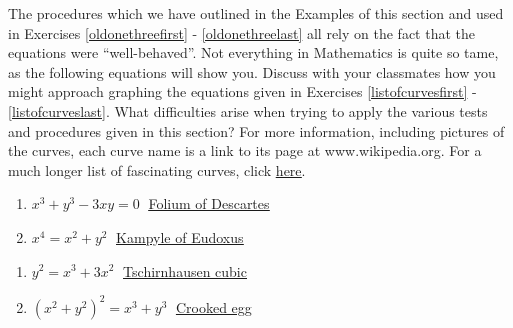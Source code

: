 \documentclass{ximera}
\begin{document}
The procedures which we have outlined in the Examples of this section and used in Exercises \ref{oldonethreefirst} -  \ref{oldonethreelast} all rely on the fact that the equations were ``well-behaved''.  Not everything in Mathematics is quite so tame, as the following equations will show you.  Discuss with your classmates how you might approach graphing the equations given in Exercises \ref{listofcurvesfirst} - \ref{listofcurveslast}.  What difficulties arise when trying to apply the various tests and procedures given in this section?  For more information, including pictures of the curves, each curve name is a link to its page at www.wikipedia.org.  For a much longer list of fascinating curves, click \href{http://en.wikipedia.org/wiki/List_of_curves}{\underline{here}}.


\begin{multicols}{2}
\begin{enumerate}
\setcounter{enumi}{\value{HW}}

\item \label{listofcurvesfirst} $x^{3} + y^{3} - 3xy = 0\;$ \href{http://en.wikipedia.org/wiki/Folium_of_descartes}{\underline{Folium of Descartes}}
\item $x^{4} = x^{2} + y^{2}\;$ \href{http://en.wikipedia.org/wiki/Kampyle_of_Eudoxus}{\underline{Kampyle of Eudoxus}}
\setcounter{HW}{\value{enumi}}
\end{enumerate}
\end{multicols}

\begin{multicols}{2}
\begin{enumerate}
\setcounter{enumi}{\value{HW}}


\item $y^{2} = x^{3} + 3x^{2}\;$ \href{http://en.wikipedia.org/wiki/Tschirnhausen_cubic}{\underline{Tschirnhausen cubic}}
\item \label{listofcurveslast} $(x^{2} + y^{2})^{2} = x^{3} + y^{3}\;$ \href{https://en.wikipedia.org/wiki/File:Crooked_egg_curve.svg}{\underline{Crooked egg}} 

\setcounter{HW}{\value{enumi}}
\end{enumerate}
\end{multicols}
\end{document}

